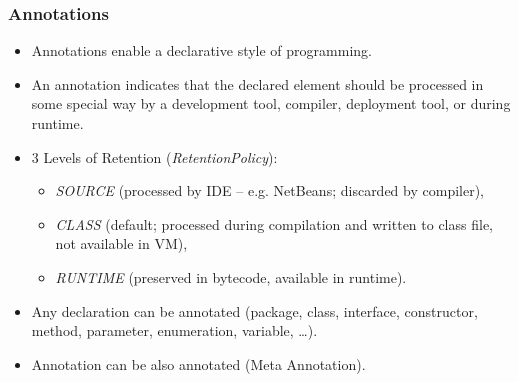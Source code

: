 \documentclass[10pt,xcolor=pdflatex]{beamer}
\begin{document}
\begin{frame}[containsverbatim]\frametitle{Annotations}
\begin{itemize}
	\item Annotations enable a declarative style of programming.
	\item An annotation indicates that the declared element should be processed in some special way by a development tool, compiler, deployment tool, or during runtime.
	\item 3 Levels of Retention (\emph{RetentionPolicy}): 
      \begin{itemize}
        \item \emph{SOURCE} (processed by IDE -- e.g. NetBeans; discarded by compiler),
        \item \emph{CLASS} (default; processed during compilation and written to class file, not available in VM), 
        \item \emph{RUNTIME} (preserved in bytecode, available in runtime).
      \end{itemize}
    \item Any declaration can be annotated (package, class, interface, constructor, method, parameter, enumeration, variable, \ldots).
    \item Annotation can be also annotated (Meta Annotation).
\end{itemize}
\end{frame}
\end{document}
